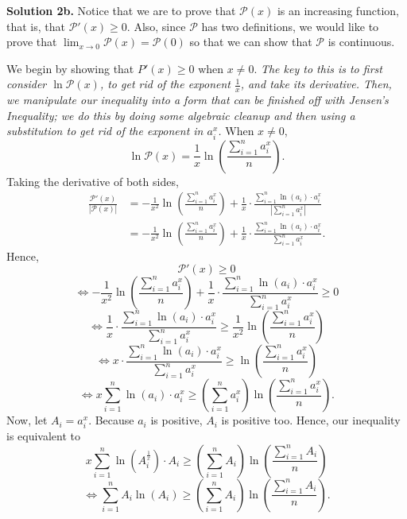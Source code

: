 \documentclass{article}
\begin{document}
\bigskip

\noindent\textbf{Solution 2b.} Notice that we are to prove that $\mathcal{P}(x)$ is an increasing function, that is, that $\mathcal{P}'(x) \geq 0$. Also, since $\mathcal{P}$ has two definitions, we would like to prove that $\lim_{x \rightarrow 0} \mathcal{P}(x) = \mathcal{P}(0)$ so that we can show that $\mathcal{P}$ is continuous.

\bigskip

We begin by showing that $P'(x) \geq 0$ when $x \neq 0$. \textit{The key to this is to first consider $\ln \mathcal{P}(x)$, to get rid of the exponent $\frac{1}{x}$, and take its derivative. Then, we manipulate our inequality into a form that can be finished off with Jensen's Inequality; we do this by doing some algebraic cleanup and then using a substitution to get rid of the exponent in $a_i^x$.} When $x \neq 0$,
\[
  \ln \mathcal{P}(x) = \frac{1}{x} \ln \left( \frac{\sum_{i=1}^n a_i^x}{n} \right) \text{.}
\]
Taking the derivative of both sides,
\begin{equation*}
    \begin{split}
        \frac{\mathcal{P}'(x)}{|\mathcal{P}(x)|} & = -\frac{1}{x^2} \ln \left( \frac{\sum_{i=1}^n a_i^x}{n} \right) + \frac{1}{x} \cdot \frac{\sum_{i=1}^n \ln (a_i) \cdot a_i^x}{\left| \sum_{i=1}^n a_i^x \right|} \\
        &= -\frac{1}{x^2} \ln \left( \frac{\sum_{i=1}^n a_i^x}{n} \right) + \frac{1}{x} \cdot \frac{\sum_{i=1}^n \ln (a_i) \cdot a_i^x}{\sum_{i=1}^n a_i^x} \text{.}
    \end{split}
\end{equation*}
Hence,
\[
  \mathcal{P}'(x) \geq 0
\]
\[
  \iff -\frac{1}{x^2} \ln \left( \frac{\sum_{i=1}^n a_i^x}{n} \right) + \frac{1}{x} \cdot \frac{\sum_{i=1}^n \ln (a_i) \cdot a_i^x}{\sum_{i=1}^n a_i^x} \geq 0
\]
\[
  \iff  \frac{1}{x} \cdot \frac{\sum_{i=1}^n \ln (a_i) \cdot a_i^x}{\sum_{i=1}^n a_i^x} \geq \frac{1}{x^2} \ln \left( \frac{\sum_{i=1}^n a_i^x}{n} \right)
\]
\[
  \iff  x \cdot \frac{\sum_{i=1}^n \ln (a_i) \cdot a_i^x}{\sum_{i=1}^n a_i^x} \geq \ln \left( \frac{\sum_{i=1}^n a_i^x}{n} \right)
\]
\[
  \iff  x \sum_{i=1}^n \ln (a_i) \cdot a_i^x \geq \left( \sum_{i=1}^n a_i^x \right) \ln \left( \frac{\sum_{i=1}^n a_i^x}{n} \right) \text{.}
\]
Now, let $A_i = a_i^x$. Because $a_i$ is positive, $A_i$ is positive too. Hence, our inequality is equivalent to
\[
  x \sum_{i=1}^n \ln \left( A_i^\frac{1}{x} \right) \cdot A_i \geq \left( \sum_{i=1}^n A_i \right) \ln \left( \frac{\sum_{i=1}^n A_i}{n} \right)
\]
\[
    \iff \sum_{i=1}^n A_i \ln (A_i) \geq \left( \sum_{i=1}^n A_i \right) \ln \left( \frac{\sum_{i=1}^n A_i}{n} \right) \text{.}
\]
\end{document}
